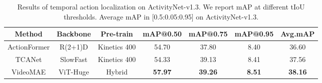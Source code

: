 \begin{table}[t]
\centering
\caption{ Results of temporal action localization on ActivityNet-v1.3. We report mAP at different tIoU thresholds. Average mAP in [0.5:0.05:0.95] on ActivityNet-v1.3.}
\begin{tabular}{c|c|c|cccc }
\hline
 \textbf{Method}& \textbf{Backbone} &\textbf{Pre-train} &\textbf{mAP@0.50}& \textbf{mAP@0.75}& \textbf{mAP@0.95} & \textbf{Avg.mAP} \\
\hline 
ActionFormer \cite{zhang2022actionformer} & R(2+1)D   & Kinetics 400   &54.70 & 37.80 & 8.40 &36.60 \\
TCANet \cite{qing2021temporal} & SlowFast & Kinetics 400 & 54.33 &39.13& 8.41& 37.56\\
VideoMAE & ViT-Huge & Hybrid & \textbf{57.97} & \textbf{39.26} & \textbf{8.51} & \textbf{38.16}  \\
\hline
\end{tabular}
\label{tab:SOAT_anet}
\vspace{-2mm}
\end{table}